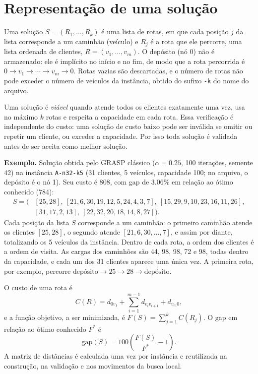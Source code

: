 \section{Representação de uma solução}

Uma solução $S=(R_1,\ldots,R_k)$ é uma lista de rotas, em que cada posição $j$ da lista corresponde a um caminhão (veículo) e $R_j$ é a rota que ele percorre, uma lista ordenada de clientes, $R=(v_1,\ldots,v_m)$. O depósito (nó $0$) não é armazenado: ele é implícito no início e no fim, de modo que a rota percorrida é $0\rightarrow v_1\rightarrow\cdots\rightarrow v_m\rightarrow 0$. Rotas vazias são descartadas, e o número de rotas não pode exceder o número de veículos da instância, obtido do sufixo \texttt{-k} do nome do arquivo.

Uma solução é \emph{viável} quando atende todos os clientes exatamente uma vez, usa no máximo $k$ rotas e respeita a capacidade em cada rota. Essa verificação é independente do custo: uma solução de custo baixo pode ser inválida se omitir ou repetir um cliente, ou exceder a capacidade. Por isso toda solução é validada antes de ser aceita como melhor solução.

\textbf{Exemplo.} Solução obtida pelo GRASP clássico ($\alpha=0.25$, 100 iterações, semente 42) na instância \texttt{A-n32-k5} (31 clientes, 5 veículos, capacidade 100; no arquivo, o depósito é o nó 1). Seu custo é 808, com gap de 3.06\% em relação ao ótimo conhecido (784):
{\small
\begin{align*}
S=\big(&[25,28],\ [21,6,30,19,12,5,24,4,3,7],\ [15,29,9,10,23,16,11,26],\\
&[31,17,2,13],\ [22,32,20,18,14,8,27]\big).
\end{align*}}
Cada posição da lista $S$ corresponde a um caminhão: o primeiro caminhão atende os clientes $[25,28]$, o segundo atende $[21,6,30,\ldots,7]$, e assim por diante, totalizando os 5 veículos da instância. Dentro de cada rota, a ordem dos clientes é a ordem de visita. As cargas dos caminhões são 44, 98, 98, 72 e 98, todas dentro da capacidade, e cada um dos 31 clientes aparece uma única vez. A primeira rota, por exemplo, percorre $\text{depósito}\rightarrow 25\rightarrow 28\rightarrow\text{depósito}$.

O custo de uma rota é
\begin{equation}
C(R)=d_{0v_1}+\sum_{i=1}^{m-1}d_{v_iv_{i+1}}+d_{v_m0},
\end{equation}
e a função objetivo, a ser minimizada, é $F(S)=\sum_{j=1}^{k}C(R_j)$. O gap em relação ao ótimo conhecido $F^*$ é
\begin{equation}
\text{gap}(S)=100\left(\frac{F(S)}{F^*}-1\right).
\end{equation}
A matriz de distâncias é calculada uma vez por instância e reutilizada na construção, na validação e nos movimentos da busca local.

